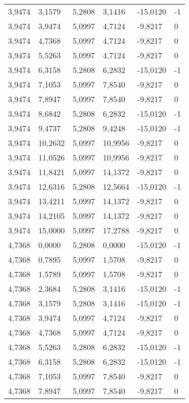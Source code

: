 \begin{longtable}{@{}llllll@{}}
		3,9474  & 3,1579  & 5,2808  & 3,1416  & -15,0120 & -1 \\
		3,9474  & 3,9474  & 5,0997  & 4,7124  & -9,8217  & 0  \\
		3,9474  & 4,7368  & 5,0997  & 4,7124  & -9,8217  & 0  \\
		3,9474  & 5,5263  & 5,0997  & 4,7124  & -9,8217  & 0  \\
		3,9474  & 6,3158  & 5,2808  & 6,2832  & -15,0120 & -1 \\
		3,9474  & 7,1053  & 5,0997  & 7,8540  & -9,8217  & 0  \\
		3,9474  & 7,8947  & 5,0997  & 7,8540  & -9,8217  & 0  \\
		3,9474  & 8,6842  & 5,2808  & 6,2832  & -15,0120 & -1 \\
		3,9474  & 9,4737  & 5,2808  & 9,4248  & -15,0120 & -1 \\
		3,9474  & 10,2632 & 5,0997  & 10,9956 & -9,8217  & 0  \\
		3,9474  & 11,0526 & 5,0997  & 10,9956 & -9,8217  & 0  \\
		3,9474  & 11,8421 & 5,0997  & 14,1372 & -9,8217  & 0  \\
		3,9474  & 12,6316 & 5,2808  & 12,5664 & -15,0120 & -1 \\
		3,9474  & 13,4211 & 5,0997  & 14,1372 & -9,8217  & 0  \\
		3,9474  & 14,2105 & 5,0997  & 14,1372 & -9,8217  & 0  \\
		3,9474  & 15,0000 & 5,0997  & 17,2788 & -9,8217  & 0  \\
		4,7368  & 0,0000  & 5,2808  & 0,0000  & -15,0120 & -1 \\
		4,7368  & 0,7895  & 5,0997  & 1,5708  & -9,8217  & 0  \\
		4,7368  & 1,5789  & 5,0997  & 1,5708  & -9,8217  & 0  \\
		4,7368  & 2,3684  & 5,2808  & 3,1416  & -15,0120 & -1 \\
		4,7368  & 3,1579  & 5,2808  & 3,1416  & -15,0120 & -1 \\
		4,7368  & 3,9474  & 5,0997  & 4,7124  & -9,8217  & 0  \\
		4,7368  & 4,7368  & 5,0997  & 4,7124  & -9,8217  & 0  \\
		4,7368  & 5,5263  & 5,2808  & 6,2832  & -15,0120 & -1 \\
		4,7368  & 6,3158  & 5,2808  & 6,2832  & -15,0120 & -1 \\
		4,7368  & 7,1053  & 5,0997  & 7,8540  & -9,8217  & 0  \\
		4,7368  & 7,8947  & 5,0997  & 7,8540  & -9,8217  & 0  \\

\end{longtable}
